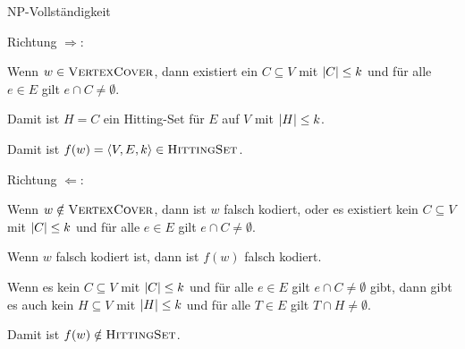 \documentclass[answers]{submit}
\begin{document}
\begin{exercise}[7]{NP-Vollständigkeit}
{    Richtung $\Rightarrow$:

    Wenn $w\in\textsc{VertexCover}$,
    dann existiert ein $C\subseteq V$ mit $\left\vert C \right\vert\leq k$ und für alle $e\in E$ gilt $e\cap C\neq\emptyset$.

    Damit ist $H=C$ ein Hitting-Set für $E$ auf $V$ mit $\left\vert H \right\vert\leq k$.

    Damit ist $f(w)=\langle V, E, k \rangle\in\textsc{HittingSet}$.

    Richtung $\Leftarrow$:

    Wenn $w\notin\textsc{VertexCover}$,
    dann ist $w$ falsch kodiert,
    oder es existiert kein $C\subseteq V$ mit $\left\vert C \right\vert\leq k$ und für alle $e\in E$ gilt $e\cap C\neq\emptyset$.

    Wenn $w$ falsch kodiert ist, dann ist $f(w)$ falsch kodiert.

    Wenn es kein $C\subseteq V$ mit $\left\vert C \right\vert\leq k$ und für alle $e\in E$ gilt $e\cap C\neq\emptyset$ gibt,
    dann gibt es auch kein $H\subseteq V$ mit $\left\vert H \right\vert\leq k$ und für alle $T\in E$ gilt $T\cap H\neq\emptyset$.

    Damit ist $f(w)\notin\textsc{HittingSet}$.
  }
\end{exercise}
\end{document}
